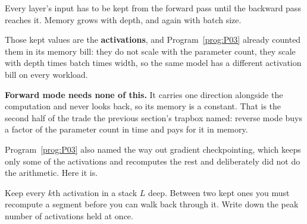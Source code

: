 \begin{fr}
\begin{ansblock}
Every layer's input has to be kept from the forward pass until the backward
pass reaches it. Memory grows with depth, and again with batch size.
\end{ansblock}

Those kept values are the \textbf{activations}, and Program~\ref{prog:P03}
already counted them in its memory bill: they do not scale with the parameter
count, they scale with depth times batch times width, so the same model has a
different activation bill on every workload.

\textbf{Forward mode needs none of this.} It carries one direction alongside
the computation and never looks back, so its memory is a constant. That is the
second half of the trade the previous section's trapbox named: reverse mode
buys a factor of the parameter count in time and pays for it in memory.

\end{fr}

\begin{fr}
Program~\ref{prog:P03} also named the way out \dash{} gradient checkpointing,
which keeps only some of the activations and recomputes the rest \dash{} and
deliberately did not do the arithmetic. Here it is.

Keep every $k$th activation in a stack $L$ deep. Between two kept ones you
must recompute a segment before you can walk back through it. Write down the
peak number of activations held at once.
\dotline
\nextframe
\end{fr}

